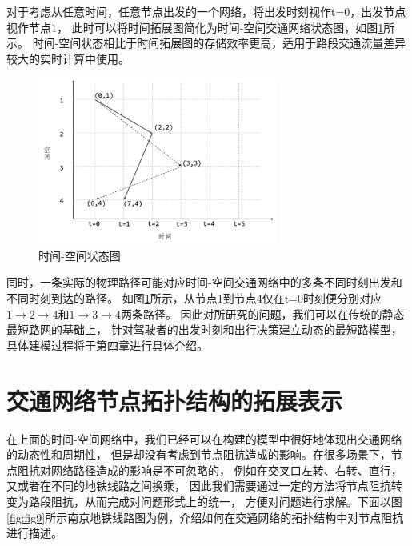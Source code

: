 对于考虑从任意时间，任意节点出发的一个网络，将出发时刻视作t=0，出发节点视作节点1，
此时可以将时间拓展图简化为时间-空间交通网络状态图，如图\ref{fig:fig8}所示。
时间-空间状态相比于时间拓展图的存储效率更高，适用于路段交通流量差异较大的实时计算中使用。

\begin{figure}[H] %
    \centering %
    \includegraphics[width=0.7\textwidth]{png/图片8 时间-空间状态图} %
    \caption{时间-空间状态图} %
    \label{fig:fig8} %
\end{figure}
同时，一条实际的物理路径可能对应时间-空间交通网络中的多条不同时刻出发和不同时刻到达的路径。
如图\ref{fig:fig8}所示，从节点1到节点4仅在t=0时刻便分别对应$1\to 2\to 4$和$1\to 3\to 4$两条路径。
因此对所研究的问题，我们可以在传统的静态最短路网的基础上，
针对驾驶者的出发时刻和出行决策建立动态的最短路模型，具体建模过程将于第四章进行具体介绍。


\section{交通网络节点拓扑结构的拓展表示}\label{sec:交通网络节点拓扑结构的拓展表示}
在上面的时间-空间网络中，我们已经可以在构建的模型中很好地体现出交通网络的动态性和周期性，
但是却没有考虑到节点阻抗造成的影响。在很多场景下，节点阻抗对网络路径造成的影响是不可忽略的，
例如在交叉口左转、右转、直行，又或者在不同的地铁线路之间换乘，
因此我们需要通过一定的方法将节点阻抗转变为路段阻抗，从而完成对问题形式上的统一，
方便对问题进行求解。下面以图\ref{fig:fig9}所示南京地铁线路图为例，介绍如何在交通网络的拓扑结构中对节点阻抗进行描述。

